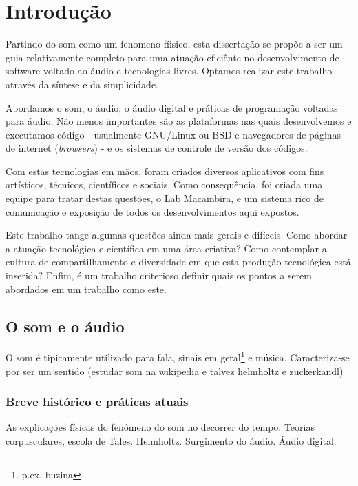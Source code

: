 \chapter{Introdução} %
\label{cap:intro} %
Partindo do som como um fenomeno fíisico, esta dissertação se propõe a ser um guia relativamente 
completo para uma atuação eficiênte no desenvolvimento
de software voltado ao áudio e tecnologias livres. Optamos
realizar este trabalho através da síntese e da simplicidade. 

Abordamos o som, o áudio, o áudio digital e práticas de programação voltadas para
áudio. Não menos importantes são as plataformas nas quais desenvolvemos e executamos código
- usualmente GNU/Linux ou BSD e navegadores de páginas de internet (\emph{browsers}) - e
os sistemas de controle de versão dos códigos.

Com estas tecnologias em mãos, foram criados diversos aplicativos com fins artísticos,
técnicos, científicos e sociais. Como consequência, foi criada uma equipe para tratar
destas questões, o Lab Macambira, e um sistema rico de comunicação e exposição de todos
os desenvolvimentos aqui expostos.

Este trabalho tange algumas questões ainda mais gerais e difíceis.
Como abordar a atuação tecnológica e científica em uma área criativa? Como contemplar
a cultura de compartilhamento e diversidade em que esta produção tecnológica está inserida?
Enfim, é um trabalho criterioso definir quais os pontos a serem abordados em
um trabalho como este.


\section{O som e o áudio}
O som é tipicamente utilizado para fala, sinais em geral\footnote{p.ex. buzina} e música.
Caracteriza-se por ser um sentido (estudar som na wikipedia e talvez helmholtz e zuckerkandl)


  \subsection{Breve histórico e práticas atuais}
As explicações físicas do fenômeno do som no decorrer do tempo. Teorias
corpusculares, escola de Tales. Helmholtz. Surgimento do áudio. Áudio digital.


